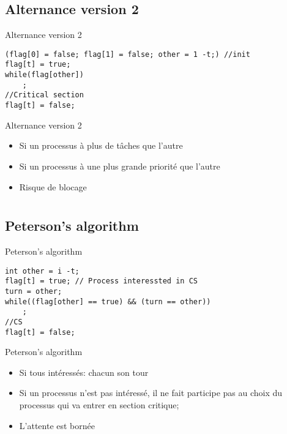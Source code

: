 \begin{frame}[containsverbatim]{\sectitle}
\def\subsectitle{Alternance version 2}
\subsection{\subsectitle}

\begin{exampleblock}{\subsectitle}
\begin{verbatim}
(flag[0] = false; flag[1] = false; other = 1 -t;) //init
flag[t] = true;
while(flag[other])
    ;
//Critical section
flag[t] = false;
\end{verbatim}
\end{exampleblock}

\begin{alertblock}{\subsectitle}
\begin{itemize}
    \item Si un processus à plus de tâches que l'autre
    \item Si un processus à une plus grande priorité que l'autre
    \item Risque de blocage
\end{itemize}
\end{alertblock}

\end{frame}


\def\sectitle{}
\section{\sectitle}
\begin{frame}[containsverbatim]{\sectitle}
\def\subsectitle{Peterson's algorithm}
\subsection{\subsectitle}
\begin{exampleblock}{\subsectitle}
\begin{verbatim}
int other = i -t;
flag[t] = true; // Process interessted in CS
turn = other;
while((flag[other] == true) && (turn == other))
    ;
//CS
flag[t] = false;
\end{verbatim}
\end{exampleblock}


\begin{alertblock}{\subsectitle}
\begin{itemize}
    \item Si tous intéressés: chacun son tour
    \item Si un processus n'est pas intéressé, il ne fait participe pas au choix
    du processus qui va entrer en section critique;
    \item L'attente est bornée
\end{itemize}
\end{alertblock}
\end{frame}

